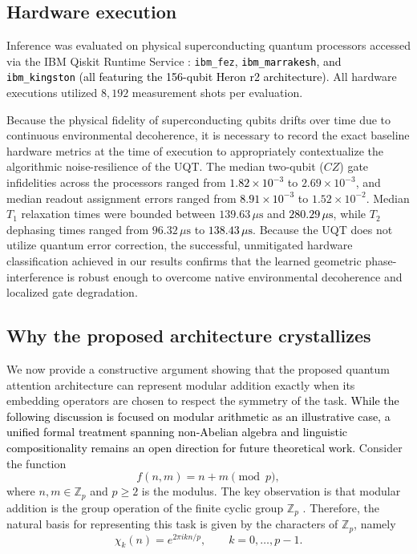\documentclass[11pt, a4paper]{article}
\begin{document}
\subsection*{Hardware execution}
Inference was evaluated on physical superconducting quantum processors accessed via the IBM Qiskit Runtime Service \cite{javadi2024quantum}: \texttt{ibm\_fez}\textcolor{black}{, \texttt{ibm\_marrakesh}, and \texttt{ibm\_kingston} (all featuring the 156-qubit Heron r2 architecture)}. All hardware executions utilized $8,192$ measurement shots per evaluation.

Because the physical fidelity of superconducting qubits drifts over time due to continuous environmental decoherence, it is necessary to record the exact baseline hardware metrics at the time of execution to appropriately contextualize the algorithmic noise-resilience of the UQT. The median two-qubit ($CZ$) gate infidelities across the processors ranged from \textcolor{black}{$1.82 \times 10^{-3}$} to $2.69 \times 10^{-3}$, and median readout assignment errors ranged from \textcolor{black}{$8.91 \times 10^{-3}$} to $1.52 \times 10^{-2}$. Median $T_1$ relaxation times were bounded between $139.63 \, \mu\text{s}$ and \textcolor{black}{$280.29 \, \mu\text{s}$}, while $T_2$ dephasing times ranged from $96.32 \, \mu\text{s}$ to \textcolor{black}{$138.43 \, \mu\text{s}$}. Because the UQT does not utilize quantum error correction, the successful, unmitigated hardware classification achieved in our results confirms that the learned geometric phase-interference is robust enough to overcome native environmental decoherence and localized gate degradation.

\subsection*{Why the proposed architecture crystallizes} 
We now provide a constructive argument showing that the proposed quantum attention architecture can represent modular addition exactly when its embedding operators are chosen to respect the symmetry of the task. \textcolor{black}{While the following discussion is focused on modular arithmetic as an illustrative case, a unified formal treatment spanning non-Abelian algebra and linguistic compositionality remains an open direction for future theoretical work.} Consider the function
\begin{equation}
f(n,m)=n+m \pmod p,
\end{equation}
where $n,m \in \mathbb{Z}_p$ and $p\ge 2$ is the modulus. The key observation is that modular addition is the group operation of the finite cyclic group $\mathbb{Z}_p$ \cite{gromov2023grokking}. Therefore, the natural basis for representing this task is given by the characters of $\mathbb{Z}_p$, namely
\begin{equation}
\chi_k(n)=e^{2\pi i kn/p}, \qquad k=0,\dots,p-1.
\end{equation}
\end{document}
